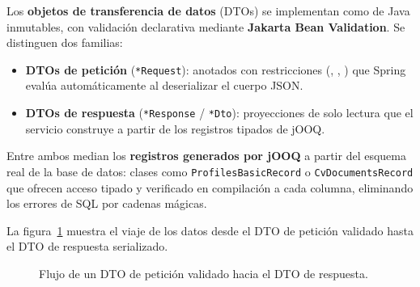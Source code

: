 Los \textbf{objetos de transferencia de datos} (DTOs) se implementan como
 de Java inmutables, con validación declarativa mediante \textbf{Jakarta
Bean Validation}. Se distinguen dos familias:

\begin{itemize}[noitemsep]
    \item \textbf{DTOs de petición} (\texttt{*Request}): anotados con restricciones
    (, , ) que Spring evalúa
    automáticamente al deserializar el cuerpo JSON.
    \item \textbf{DTOs de respuesta} (\texttt{*Response} / \texttt{*Dto}): proyecciones de
    solo lectura que el servicio construye a partir de los registros tipados de jOOQ.
\end{itemize}

Entre ambos median los \textbf{registros generados por jOOQ} a partir del esquema real de
la base de datos: clases como \texttt{ProfilesBasicRecord} o \texttt{CvDocumentsRecord}
que ofrecen acceso tipado y verificado en compilación a cada columna, eliminando los
errores de SQL por cadenas mágicas.

La figura~\ref{fig:dto-flujo} muestra el viaje de los datos desde el DTO de petición
validado hasta el DTO de respuesta serializado.

\vspace{0.3cm}
\begin{figure}[h!]
\centering
{}
\caption{Flujo de un DTO de petición validado hacia el DTO de respuesta.}
\label{fig:dto-flujo}
\end{figure}

